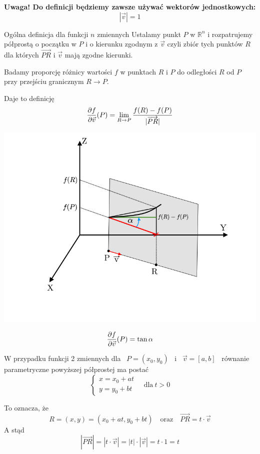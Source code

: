 \textbf{Uwaga! Do definicji będziemy zawsze używać wektorów jednostkowych:}
\[ |\vec{v}| = 1 \]

\begin{tw}{Ogólna definicja dla funkcji $n$ zmiennych}
    Ustalamy punkt $P$ w $\mathbb{R}^n$ i rozpatrujemy półprostą o początku w $P$ i o kierunku zgodnym z $\vec{v}$ czyli zbiór tych punktów
    $R$ dla których $\overrightarrow{PR}$ i $\vec{v}$ mają zgodne kierunki.

    Badamy proporcję różnicy wartości $f$ w punktach $R$ i $P$ do odległości $R$ od $P$ przy przejściu granicznym $ R \to P $.

    Daje to definicję
    \[ \frac{\partial f}{\partial \vec{v}}(P) = \lim_{R \to P} \frac{f(R) - f(P)}{|\overrightarrow{PR}|} \]

    \begin{center}
        \includegraphics[scale=0.5]{img/pochodnakierunkowa.png}
    \end{center}
    \[ \frac{\partial f}{\partial \vec{v}}(P) = \tan \alpha \]
\end{tw}

W przypadku funkcji 2 zmiennych dla \ $ P = (x_0, y_0) $ \ i \ $ \vec{v} = [a,b] $ \ równanie parametryczne powyższej półprostej ma postać
\[ \begin{cases} 
    x = x_0 + at \\
    y = y_0 + bt
\end{cases} \quad \text{dla} \ t > 0 \]

To oznacza, że
\[ R = (x,y) = (x_0 + at, y_0 + bt) \quad \text{oraz} \quad \overrightarrow{PR} = t \cdot \vec{v} \]
A stąd
\[ |\overrightarrow{PR}| = |t \cdot \vec{v}| = |t| \cdot |\vec{v}| = t \cdot 1 = t \]

